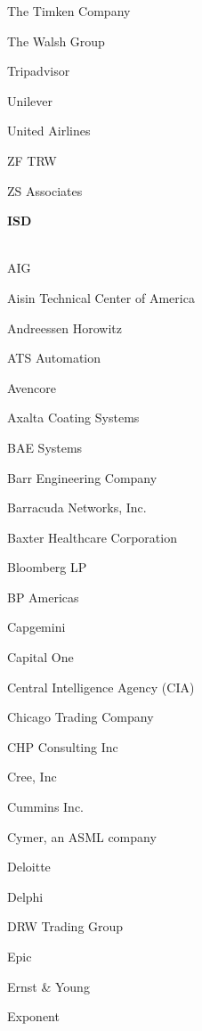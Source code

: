 \documentclass[twoside]{article}
\begin{document}
\begin{center}
\begin{multicols}{5}
\begin{FlushLeft}
\begin{compactitem}
\item The Timken Company
\item The Walsh Group
\item Tripadvisor
\item Unilever
\item United Airlines
\item ZF TRW
\item ZS Associates
\end{compactitem}
        \end{FlushLeft}
        \vspace{1em}
        {\fontsize{14}{16}\selectfont \bf ISD}\\
        \vspace{-1em}
        ~\hrulefill~
        \vspace{-.9em}
        \begin{FlushLeft}
        \begin{compactitem}
        \item AIG
\item Aisin Technical Center of America
\item Andreessen Horowitz
\item ATS Automation
\item Avencore
\item Axalta Coating Systems
\item BAE Systems
\item Barr Engineering Company
\item Barracuda Networks, Inc.
\item Baxter Healthcare Corporation
\item Bloomberg LP
\item BP Americas
\item Capgemini
\item Capital One
\item Central Intelligence Agency (CIA)
\item Chicago Trading Company
\item CHP Consulting Inc
\item Cree, Inc
\item Cummins Inc.
\item Cymer, an ASML company
\item Deloitte
\item Delphi
\item DRW Trading Group
\item Epic
\item Ernst \& Young
\item Exponent

\end{compactitem}
\end{FlushLeft}
\end{multicols}
\end{center}
\end{document}
